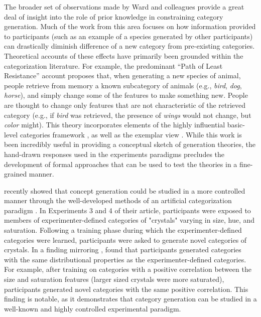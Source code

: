\documentclass[12pt]{article}
\begin{document}
\begin{flushleft}
The broader set of observations made by Ward and colleagues provide a great deal
of insight into the role of prior knowledge in constraining category generation.
Much of the work from this area
\citep[e.g.,][]{smith1993constraining,marsh1999inadvertent} focuses on how
information provided to participants (such as an example of a species generated
by other participants) can drastically diminish difference of a new category
from pre-existing categories. Theoretical accounts of these effects have
primarily been grounded within the categorization literature. For example, the
predominant ``Path of Least Resistance'' account
\citep[see][]{ward1994structured,ward1995s,ward2002role} proposes that, when
generating a new species of animal, people retrieve from memory a known
subcategory of animals (e.g., {\em bird}, {\em dog}, {\em horse}), and simply
change some of the features to make something new. People are thought to change
only features that are not characteristic of the retrieved category (e.g., if
{\em bird} was retrieved, the presence of {\em wings} would not change, but {\em
color} might). This theory incorporates elements of the highly influential
basic-level categories framework \citep{rosch1975cognitive,rosch1976basic}, as
well as the exemplar view \citep{medin1978context,brooks1978nonanalytic}. While
this work is been incredibly useful in providing a conceptual sketch of
generation theories, the hand-drawn responses used in the experiments paradigms
precludes the development of formal approaches that can be used to test the
theories in a fine-grained manner.

\cite{jern2013probabilistic} recently showed that concept generation could be
studied in a more controlled manner through the well-developed methods of an
artificial categorization paradigm \citep[see][for a review]{kurtz2015human}. In
Experiments 3 and 4 of their article, participants were exposed to members of
experimenter-defined categories of "crystals" varying in size, hue, and
saturation. Following a training phase during which the experimenter-defined
categories were learned, participants were asked to generate novel categories of
crystals. In a finding mirroring \cite{ward1994structured},
\cite{jern2013probabilistic} found that participants generated categories with
the same distributional properties as the experimenter-defined categories. For
example, after training on categories with a positive correlation between the
size and saturation features (larger sized crystals were more saturated),
participants generated novel categories with the same positive correlation. This
finding is notable, as it demonstrates that category generation can be studied
in a well-known and highly controlled experimental paradigm.


\end{flushleft}
\end{document}
